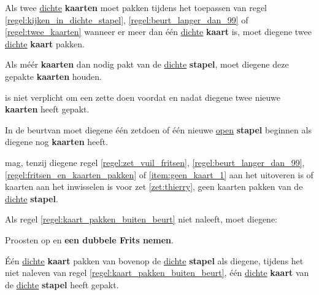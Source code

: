 \vervolgLijst{}
\item Als \eenSpeler twee \ul{dichte} \textbf{kaarten} moet pakken tijdens het toepassen van regel \ref{regel:kijken_in_dichte_stapel}, \ref{regel:beurt_langer_dan_99} of \ref{regel:twee_kaarten} wanneer er meer dan \'e\'en \ul{dichte} \textbf{kaart} is, moet diegene twee \ul{dichte} \textbf{kaart} pakken.
\label{item:geen_kaart_3}
\eindLijst{}

\vervolgLijst{}
\item Als \eenSpeler méér \textbf{kaarten} dan nodig pakt van de \ul{dichte} \textbf{stapel}, moet diegene deze gepakte \textbf{kaarten} houden.
\eindLijst{}

\vervolgLijst{}
\item \EenSpeler is niet verplicht om een zet\footnotemark[4] te doen voordat en nadat diegene twee nieuwe \textbf{kaarten} heeft gepakt.
\eindLijst{}

\vervolgLijst{}
\item In de beurt\footnotemark[1] van \eenSpeler moet diegene \'e\'en zet\footnotemark[4] doen of \'e\'en nieuwe \ul{open} \textbf{stapel} beginnen als diegene nog \textbf{kaarten} heeft.
\eindLijst{}


\newpage
{}


\vervolgLijst{}
\item \EenSpeler mag, tenzij diegene regel \ref{regel:zet_vuil_fritsen}, \ref{regel:beurt_langer_dan_99}, \ref{regel:fritsen_en_kaarten_pakken} of \ref{item:geen_kaart_1} aan het uitoveren is of kaarten aan het inwisselen is voor zet \ref{zet:thierry}, geen kaarten pakken van de \ul{dichte} \textbf{stapel}.
\label{regel:kaart_pakken_buiten_beurt}
\eindLijst{}

\vervolgLijst{}
\item Als \eenSpeler regel \ref{regel:kaart_pakken_buiten_beurt} niet naleeft, moet diegene:
\puntLijst{}
\item Proosten op  en \textbf{een dubbele Frits nemen}\footnotemark[1].
\item Één \ul{dichte} \textbf{kaart} pakken van bovenop de \ul{dichte} \textbf{stapel} als diegene, tijdens het niet naleven van regel \ref{regel:kaart_pakken_buiten_beurt}, één \ul{dichte} \textbf{kaart} van de \ul{dichte} \textbf{stapel} heeft gepakt.
\eindPuntLijst{}
\label{regel:kaart_pakken_buiten_beurt_straf}
\eindLijst{}

